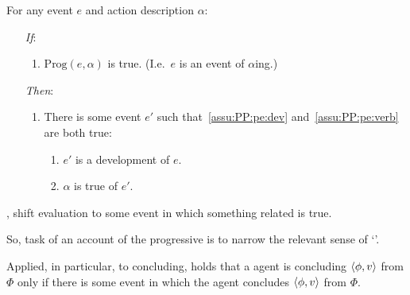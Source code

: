 \begin{note}
  \begin{assumption}[\assuPP{2}]
    \label{assu:PP}
    For any event \(e\) and action description \(\alpha\):
    \begin{enumerate}
    \item[\emph{If}:]
      \begin{enumerate}[label=\alph*., ref=(\alph*)]
      \item
        \(\text{Prog}(e,\alpha)\) is true.%
        \hfill(I.e.\ \(e\) is an event of \(\alpha\)ing.)
      \end{enumerate}
    \item[\emph{Then}:]
      \begin{enumerate}[label=\alph*., ref=(\alph*), resume]
      \item
        There is some  event \(e'\) such that~\ref{assu:PP:pe:dev} and~\ref{assu:PP:pe:verb} are both true:
        \begin{enumerate}[label=\roman*., ref=(\roman*)]
        \item
          \label{assu:PP:pe:dev}
          \(e'\) is a development of \(e\).
        \item
          \label{assu:PP:pe:verb}
          \(\alpha\) is true of \(e'\).
        \end{enumerate}
      \end{enumerate}
    \end{enumerate}
    \vspace{-\baselineskip}
  \end{assumption}

  , shift evaluation to some  event in which something related is true.

  So, task of an account of the progressive is to narrow the relevant sense of `'.

  Applied, in particular, to concluding,  holds that a agent is concluding \(\langle \phi, v \rangle\) from \(\Phi\) only if there is some  event in which the agent concludes \(\langle \phi, v \rangle\) from \(\Phi\).
\end{note}

